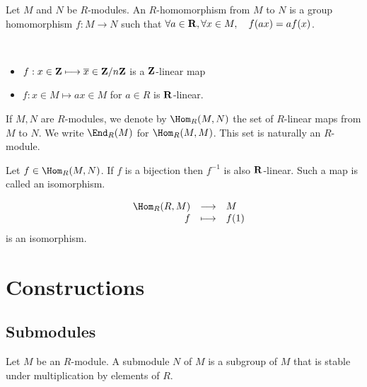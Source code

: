 \begin{dfn}
    Let $M$ and $N$ be $R$-modules. An $R$-homomorphism\footnotemark{} from $M$ to $N$ is a group homomorphism $f: M \longrightarrow N$ such that $\forall a\in \mathbf R, \forall x\in M, \quad f(ax)=af(x)$.
\end{dfn}


\begin{ex}~
\begin{itemize}
    \item $f : x\in \mathbf Z \longmapsto \overline{x} \in \mathbf Z / n\mathbf Z $ is a $\mathbf Z$-linear map 
    \item $f : x\in M \longmapsto ax\in M$ for $a\in R$ is $\mathbf R$-linear.
\end{itemize}
\end{ex}

\begin{dfn}
If $M,N$ are $R$-modules, we denote by $\Hom_R(M, N)$ the set of $R$-linear maps from $M$ to $N$. We write $\End_R(M)$ for $\Hom_R(M,M)$. This set is naturally an $R$-module.
\end{dfn}

\begin{prop}
    Let $f\in \Hom_R(M,N)$. If $f$ is a bijection then $f^{-1}$ is also $\mathbf R$-linear. Such a map is called an isomorphism.
\end{prop}

\begin{ex}
\[
\begin{array}{rrcl}
    &  \Hom_R(R, M)& \longrightarrow & M \\
    & f & \longmapsto & \displaystyle f(1) 
\end{array}
\] 
is an isomorphism.
\end{ex}

\section{Constructions}

\subsection{Submodules}

\begin{dfn}
    Let $M$ be an $R$-module. A submodule $N$ of $M$ is a subgroup of $M$ that is stable under multiplication by elements of $R$.
\end{dfn}


